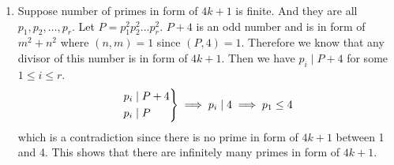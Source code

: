 \begin{enumerate}[label=]
    \item 
        Suppose number of primes in form of $4k + 1$ is finite. And they are all $p_1, p_2, \dots, p_r$. Let $P = p_1^2 p_2^2 \dots p_r^2$. $P + 4$ is an odd number and is in form of $m^2 + n^2$ where $(n, m) = 1$ since $(P, 4) = 1$. Therefore we know that any divisor of this number is in form of $4k + 1$. 
        Then we have $p_i \mid P + 4$ for some $1 \le i \le r$.
        \begin{gather*}
            \begin{rcases}
                p_i \mid P + 4\\
                p_i \mid P                
            \end{rcases} \implies p_i \mid 4 \implies p_1 \le 4
        \end{gather*}
        which is a contradiction since there is no prime in form of $4k + 1$ between 1 and 4. This shows that there are infinitely many primes in form of $4k + 1$.
\end{enumerate}